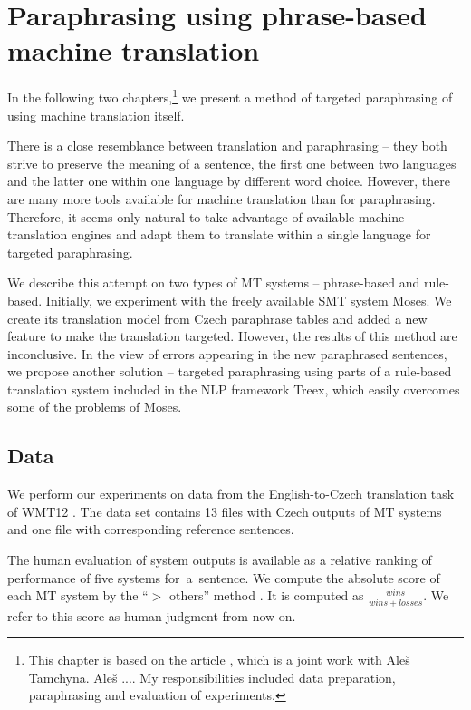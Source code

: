 \chapter{Paraphrasing using phrase-based machine translation}

In the following two chapters,\footnote{This chapter is based on the article \citep{barancikova:itat2014}, which is a joint work with Aleš Tamchyna. 
Aleš .... My responsibilities included data preparation, paraphrasing and evaluation of experiments.} 
we present a method of targeted paraphrasing of using machine translation itself. 

There is a close resemblance between translation and paraphrasing -- they both strive to preserve the meaning of a sentence, the first one between two languages and the latter one within one language by different word choice.  %
However, there are many more tools available for machine translation than for paraphrasing. 
Therefore, it seems only natural to take advantage of available machine translation engines and adapt them to translate within a single language for targeted paraphrasing. 
 
We describe this attempt on two types of MT systems -- phrase-based and rule-based. 
Initially, we experiment with the freely available SMT system Moses.
We create its translation model from  Czech paraphrase tables and added a new feature to make the translation targeted.
However, the results of this method are inconclusive. 
In the view of errors appearing in the new paraphrased sentences, we propose another solution -- targeted paraphrasing using parts of a rule-based translation system included in the NLP framework Treex, which easily overcomes some of the problems of Moses. 


\section{Data} 
We perform our experiments on data from the English-to-Czech translation task 
of WMT12 \cite{wmt12}. The data set contains 13 files with Czech outputs of MT 
systems and one file with corresponding reference sentences.

The human evaluation of system outputs is available as a relative ranking of 
performance of five systems for~a~sentence. We compute the absolute score of each
MT system by the “$ > $ others” method \cite{bojar-grains}. It is computed as 
$ \frac{wins}{wins+losses} $. We refer to this score as human judgment from now on.


